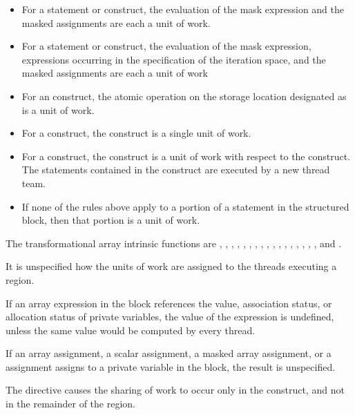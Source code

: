 \begin{fortranspecific}
\begin{itemize}
\item For a  statement or construct, the evaluation of the mask expression and the
masked assignments are each a unit of work.

\item For a  statement or construct, the evaluation of the mask expression,
expressions occurring in the specification of the iteration space, and the masked
assignments are each a unit of work

\item For an  construct, the atomic operation on the storage location designated as
 is a unit of work.

\item For a  construct, the construct is a single unit of work.

\item For a  construct, the construct is a unit of work with respect to the
 construct. The statements contained in the  construct are
executed by a new thread team.

\item If none of the rules above apply to a portion of a statement in the structured block,
then that portion is a unit of work.
\end{itemize}

The transformational array intrinsic functions are , , ,
, , , ,
, , , , ,
, , , , , and .

It is unspecified how the units of work are assigned to the threads executing a
 region.

If an array expression in the block references the value, association status, or allocation
status of private variables, the value of the expression is undefined, unless the same
value would be computed by every thread.

If an array assignment, a scalar assignment, a masked array assignment, or a 
assignment assigns to a private variable in the block, the result is unspecified.

The  directive causes the sharing of work to occur only in the 
construct, and not in the remainder of the  region.


\end{fortranspecific}
